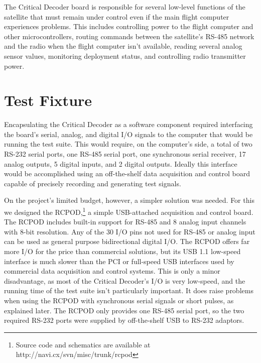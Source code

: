 \documentclass[letterpaper]{article}
\begin{document}
The Critical Decoder board is responsible for several low-level functions of the satellite that must
remain under control even if the main flight computer experiences problems. This includes controlling
power to the flight computer and other microcontrollers, routing commands between the satellite's RS-485
network and the radio when the flight computer isn't available, reading several analog sensor values,
monitoring deployment status, and controlling radio transmitter power.

\section{Test Fixture}

Encapsulating the Critical Decoder as a software component required interfacing the board's serial, analog,
and digital I/O signals to the computer that would be running the test suite. This would require, on the
computer's side, a total of two RS-232 serial ports, one RS-485 serial port, one synchronous serial receiver,
17 analog outputs, 5 digital inputs, and 2 digital outputs. Ideally this interface would be accomplished
using an off-the-shelf data acquisition and control board capable of precisely recording and generating
test signals.

On the project's limited budget, however, a simpler solution was needed. For this we designed the
RCPOD,\footnote{Source code and schematics are available at http://navi.cx/svn/misc/trunk/rcpod}
a simple USB-attached acquisition and control board. The RCPOD includes built-in support for RS-485
and 8 analog input channels with 8-bit resolution. Any of the 30 I/O pins not used for RS-485 or analog
input can be used as general purpose bidirectional digital I/O. The RCPOD offers far more I/O for the price
than commercial solutions, but its USB 1.1 low-speed interface is much slower than the PCI or full-speed USB
interfaces used by commercial data acquisition and control systems. This is only a minor disadvantage, as
most of the Critical Decoder's I/O is
very low-speed, and the running time of the test suite isn't particularly important. It does raise problems
when using the RCPOD with synchronous serial signals or short pulses, as explained later. The RCPOD only
provides one RS-485 serial port, so the two required RS-232 ports were supplied by off-the-shelf USB to RS-232 adaptors.
\end{document}

